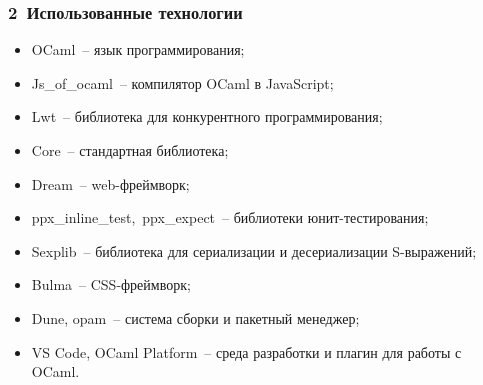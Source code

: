 \documentclass[xetex,aspectratio=43]{beamer}
\begin{document}
\begin{frame}
    \frametitle{2~Использованные технологии}

    \begin{itemize}
        \item OCaml~-- язык программирования;
        \item Js\_of\_ocaml~-- компилятор OCaml в JavaScript;
        \item Lwt~-- библиотека для конкурентного программирования;
        \item Core~-- стандартная библиотека;
        \item Dream~-- web-фреймворк;
        \item ppx\_inline\_test,~ppx\_expect~-- библиотеки юнит-тестирования;
        \item Sexplib~-- библиотека для сериализации и десериализации S-выражений;
        \item Bulma~-- CSS-фреймворк;
        \item Dune, opam~-- система сборки и пакетный менеджер;
        \item VS Code, OCaml Platform~-- среда разработки и плагин для работы с OCaml.
    \end{itemize}
\end{frame}
\end{document}
